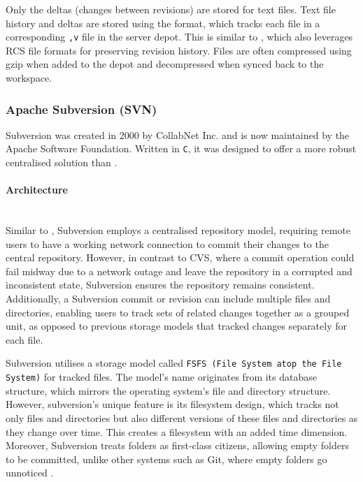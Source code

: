 Only the deltas (changes between revisions) are stored for text files. Text file history and deltas are stored using the  format, which tracks each file in a corresponding \lstinline{,v} file in the server depot. This is similar to , which also leverages RCS file formats for preserving revision history. Files are often compressed using gzip when added to the depot and decompressed when synced back to the workspace.




\subsubsection{Apache Subversion (SVN)}
\label{sec:svn}
Subversion was created in 2000 by CollabNet Inc. and is now maintained by the Apache Software Foundation. Written in \lstinline{C}, it was designed to offer a more robust centralised solution than \cite{stopak_2019}.
\paragraph{Architecture}
\hfill\medskip\\
Similar to , Subversion employs a centralised repository model, requiring remote users to have a working network connection to commit their changes to the central repository. However, in contrast to CVS, where a commit operation could fail midway due to a network outage and leave the repository in a corrupted and inconsistent state, Subversion ensures the repository remains consistent. Additionally, a Subversion commit or revision can include multiple files and directories, enabling users to track sets of related changes together as a grouped unit, as opposed to previous storage models that tracked changes separately for each file.
\smallskip

Subversion utilises a storage model called \lstinline{FSFS (File System atop the File System)} for tracked files. The model's name originates from its database structure, which mirrors the operating system's file and directory structure. However, subversion's unique feature is its filesystem design, which tracks not only files and directories but also different versions of these files and directories as they change over time. This creates a filesystem with an added time dimension. Moreover, Subversion treats folders as first-class citizens, allowing empty folders to be committed, unlike other systems such as Git, where empty folders go unnoticed \cite{stopak_2019}.
\smallskip

